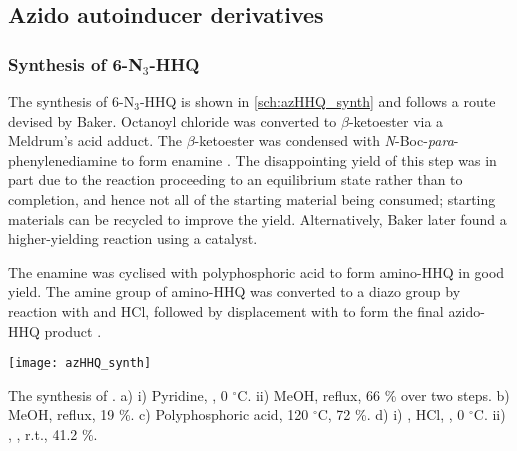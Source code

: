 \subsection{Azido autoinducer derivatives}

\subsubsection{Synthesis of 6-N$_3$-HHQ }

The synthesis of 6-N$_3$-HHQ  is shown in \ref{sch:azHHQ_synth} and follows a route devised by Baker\cite{Baker2015}. Octanoyl chloride  was converted to $\beta$-ketoester  via a Meldrum's acid adduct\cite{Baker2012,Scribner1978}. The $\beta$-ketoester  was condensed with \textit{N}-Boc-\textit{para}-phenylenediamine  to form enamine . The disappointing yield of this step was in part due to the reaction proceeding to an equilibrium state rather than to completion, and hence not all of the starting material being consumed; starting materials can be recycled to improve the yield. Alternatively, Baker later found a higher-yielding reaction using a  catalyst.

The enamine  was cyclised with polyphosphoric acid to form amino-HHQ  in good yield. The amine group of amino-HHQ  was converted to a diazo group by reaction with  and HCl, followed by displacement with  to form the final azido-HHQ product \cite{Xu2013}.

\begin{scheme}[H]
	\begin{center}
		\texttt{[image: azHHQ\_synth]}
		\caption{The synthesis of . 
		a) i) Pyridine, , 0 $^{\circ}$C. ii) MeOH, reflux, 66 \% over two steps. 
		b) MeOH, reflux, 19 \%. 
		c) Polyphosphoric acid, 120 $^{\circ}$C, 72 \%. 
		d) i) , HCl, , 0 $^{\circ}$C. ii) , , r.t., 41.2 \%.
		\label{sch:azHHQ_synth}}
	\end{center}
\end{scheme}

